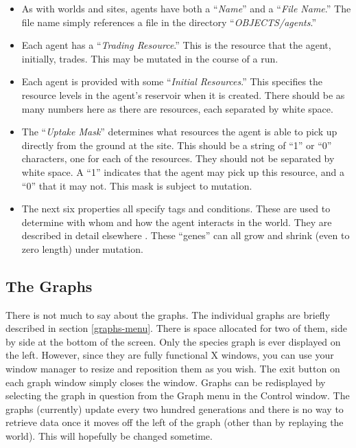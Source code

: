 \begin{itemize}

\item
As with worlds and sites, agents have both a ``{\sl Name}''
 and a
``{\sl File Name}.''  The file name simply
references a file in the directory ``{\sl OBJECTS/agents}.''

\item
Each agent has a ``{\sl Trading Resource}.'' 
  This is the resource that
the agent, initially, trades. This may be mutated in the course of a
run.

\item
Each agent is provided with some ``{\sl Initial Resources}.''
   This
specifies the resource levels in the agent's reservoir  when it is created. There should be as many numbers here
as there are resources, each separated by white space.

\item
The ``{\sl Uptake Mask}''   determines what resources the agent is able to pick up directly
from the ground at the site. This should be a string of ``1'' or ``0''
characters, one for each of the resources. They should not be
separated by white space. A ``1'' indicates that the agent may pick up
this resource, and a ``0'' that it may not. This mask is subject to
mutation.

\item
The next six properties all specify tags  and conditions.
 These are
used to determine with whom and how the agent interacts in the world.
They are described in detail elsewhere
\cite{holland-92a,holland-92b}. These ``genes'' can all grow and
shrink (even to zero length) under mutation. 

\end{itemize}

\subsection{The Graphs}

There is not much to say about the graphs. The individual graphs are
briefly described in section \ref{graphs-menu}. There is space
allocated for two of them, side by side at the bottom of the
screen. Only the species graph is ever displayed on the left. However,
since they are fully functional X windows, you can use your window
manager to resize and reposition them as you wish. The exit button on
each graph window simply closes the window. Graphs can be redisplayed
by selecting the graph in question from the Graph menu in the Control
window. The graphs (currently) update every two hundred generations
and there is no way to retrieve data once it moves off the left of the
graph (other than by replaying the world). This will hopefully be
changed sometime.

